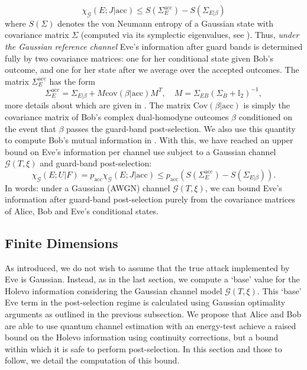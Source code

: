 ﻿\documentclass[12pt]{article}
\begin{document}
\begin{equation}
\chi_\mathcal{G}(E;J|\text{acc}) \leq S(\Sigma_E^\text{acc}) - S(\Sigma_{E|\beta})
\end{equation}
where $S(\Sigma)$ denotes the von Neumann entropy of a Gaussian state with covariance matrix $\Sigma$ (computed via its symplectic eigenvalues, see ). Thus, \textit{under the Gaussian reference channel} Eve's information after guard bands is determined fully by two covariance matrices: one for her conditional state given Bob's outcome, and one for her state after we average over the accepted outcomes. The matrix $\Sigma_E^\text{acc}$ has the form
\begin{equation}
  \Sigma_E^\text{acc} = \Sigma_{E|\beta} + M \text{cov}(\beta|\text{acc})M^T, \quad M = \Sigma_{EB}(\Sigma_B + \mathbb{I}_2)^{-1},
\end{equation}
more details about which are given in . The matrix $\text{Cov}(\beta|\text{acc})$ is simply the covariance matrix of Bob's complex dual-homodyne outcomes $\beta$ conditioned on the event that $\beta$ passes the guard-band post-selection. We also use this quantity to compute Bob's mutual information in . With this, we have reached an upper bound on Eve's information per channel use subject to a Gaussian channel $\mathcal{G}(T, \xi)$ and guard-band post-selection:
\begin{equation}
  \label{eq: final gaussian bound}
  \boxed{\chi_\mathcal{G}(E;U|F) = p_\text{acc} \chi_\mathcal{G}(E;J|\text{acc}) \leq p_\text{acc} \left(S(\Sigma_E^\text{acc}) - S(\Sigma_{E|\beta})\right).}
\end{equation}
In words: under a Gaussian (AWGN) channel $\mathcal{G}(T,\xi)$, we can bound Eve's information after guard-band post-selection purely from the covariance matrices of Alice, Bob and Eve's conditional states.

\subsection{Finite Dimensions}
\label{subsec: Finite Dimensions}

As introduced, we do not wish to assume that the true attack implemented by Eve is Gaussian. Instead, as in the last section, we compute a `base' value for the Holevo information considering the Gaussian channel model $\mathcal{G}(T, \xi)$. This `base' Eve term in the post-selection regime is calculated using Gaussian optimality arguments as outlined in the previous subsection. We propose that Alice and Bob are able to use quantum channel estimation with an energy-test achieve a raised bound on the Holevo information using continuity corrections, but a bound within which it is safe to perform post-selection. In this section and those to follow, we detail the computation of this bound.
\end{document}
